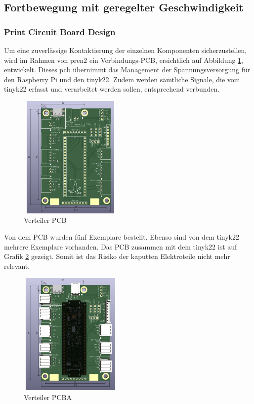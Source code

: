 \subsection{Fortbewegung mit geregelter Geschwindigkeit}

\subsubsection{Print Circuit Board Design}
\label{pcb}

Um eine zuverlässige Kontaktierung der einzelnen Komponenten sicherzustellen, wird im Rahmen von \acrshort{pren2} ein Verbindungs-PCB, ersichtlich auf Abbildung \ref{fig: Verteiler PCB}, entwickelt. Dieses \acrshort{pcb} übernimmt das Management der
Spannungsversorgung für den Raspberry Pi und den \gls{tinyk22}. Zudem werden sämtliche Signale,
die vom \gls{tinyk22} erfasst und verarbeitet werden sollen, entsprechend verbunden.

\begin{figure}[H]
\centering
\includegraphics[width=5cm, height=6cm]{assets/ET/PCB/VerteilerPCB_unbestueckt.png}
\caption{Verteiler PCB}
\label{fig: Verteiler PCB}
\end{figure}

Von dem PCB wurden fünf Exemplare bestellt. Ebenso sind von dem \gls{tinyk22} mehrere Exemplare vorhanden. Das PCB zusammen mit dem \gls{tinyk22} ist auf Grafik \ref{fig: Verteiler PCBA} gezeigt. Somit ist das Risiko der kaputten Elektroteile nicht mehr relevant.

\begin{figure}[H]
\centering
\includegraphics[width=5cm, height=6cm]{assets/ET/PCB/VerteilerPCB_bestueckt.png}
\caption{Verteiler PCBA}
\label{fig: Verteiler PCBA}
\end{figure}


